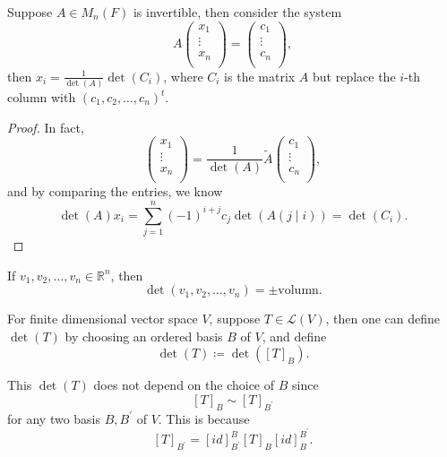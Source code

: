 \begin{theorem}
    Suppose \(A \in M_n(F)\) is invertible, then consider the system
    \[
        A \begin{pmatrix}
             x_1 \\
             \vdots \\
             x_n \\
        \end{pmatrix} = \begin{pmatrix}
             c_1 \\
             \vdots \\
             c_n \\
        \end{pmatrix},
    \] then \( x_i = \frac{1}{\det (A)} \det (C_i)\), where \(C_i\) is the matrix \(A\) but replace the \(i\)-th column with \((c_1, c_2, \dots , c_n)^t\).    
\end{theorem}
\begin{proof}
    In fact,
    \[
        \begin{pmatrix}
             x_1 \\
             \vdots \\
             x_n \\
        \end{pmatrix} = \frac{1}{\det (A)} \widetilde{A} \begin{pmatrix}
             c_1 \\
             \vdots \\
             c_n \\
        \end{pmatrix},
    \] and by comparing the entries, we know 
    \[
        \det (A) x_i = \sum_{j=1}^n (-1)^{i+j} c_j \det (A(j \mid i)) = \det (C_i). 
    \]
\end{proof}

\begin{exercise}
    If \(v_1, v_2, \dots , v_n \in \mathbb{R} ^n\), then 
    \[
        \det (v_1, v_2, \dots , v_n) = \pm \text{volumn}. 
    \] 
\end{exercise}

\begin{definition}
    For finite dimensional vector space \(V\), suppose \(T \in \mathcal{L} (V)\), then one can define \(\det (T)\) by choosing an ordered basis \(B\) of \(V\), and define 
    \[
        \det (T) \coloneqq \det \left( [T]_B \right). 
    \]     
\end{definition}

\begin{remark}
    This \(\det (T)\) does not depend on the choice of \(B\) since
    \[
        [T]_B \sim [T]_{B^{\prime} }
    \]  for any two basis \(B, B^{\prime} \) of \(V\). This is because
    \[
        [T]_{B^{\prime} } = [id]_{B^{\prime} }^B [T]_B [id]_B^{B^{\prime} }.
    \]  
\end{remark}